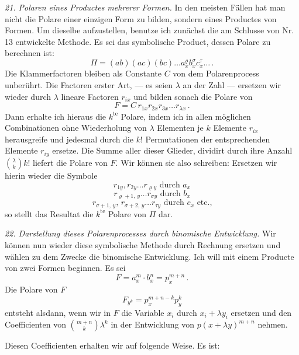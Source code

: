\textit{21. Polaren eines Productes mehrerer Formen.} In den meisten Fällen hat man nicht die Polare einer einzigen Form zu bilden, sondern eines Productes von Formen. Um dieselbe aufzustellen, benutze ich zunächst die am Schlusse von Nr. 13 entwickelte Methode. Es sei das symbolische Product, dessen Polare zu berechnen ist:
\[
\Pi = (ab)(ac)(bc)\dots a_x^\varrho b_x^\sigma c_x^\tau \dots\,.
\]
Die Klammerfactoren bleiben als Constante $C$ von dem Polarenprocess unberührt. Die Factoren erster Art, — es seien $\lambda$ an der Zahl — ersetzen wir wieder durch $\lambda$ lineare Factoren $r_{ix}$ und bilden sonach die Polare von
\[
F = C\,r_{1x}r_{2x}r_{3x}\dots r_{\lambda x}\,.
\]
Dann erhalte ich hieraus die $k^{\text{te}}$ Polare, indem ich in allen möglichen Combinationen ohne Wiederholung von $\lambda$ Elementen je $k$ Elemente $r_{ix}$ herausgreife und jedesmal durch die $k!$ Permutationen der entsprechenden Elemente $r_{iy}$ ersetze. Die Summe aller dieser Glieder, dividirt durch ihre Anzahl $\binom{\lambda}{k}k!$ liefert die Polare von $F$. Wir können sie also schreiben:
Ersetzen wir hierin wieder die Symbole
\[
r_{1y}, r_{2y}\dots r_{\varrho y} \text{ durch } a_x
\]
\[
r_{\varrho+1,\,y}\dots r_{\sigma y} \text{ durch } b_x
\]
\[
r_{\sigma+1,\,y},\, r_{\sigma+2,\,y}\dots r_{\tau y} \text{ durch } c_x \text{ etc.,}
\]
so stellt das Resultat die $k^{\text{te}}$ Polare von $\Pi$ dar.

\textit{22. Darstellung dieses Polarenprocesses durch binomische Entwicklung.} Wir können nun wieder diese symbolische Methode durch Rechnung ersetzen und wählen zu dem Zwecke die binomische Entwicklung. Ich will mit einem Producte von zwei Formen beginnen. Es sei
\[
F = a_x^m\cdot b_x^n = p_x^{m+n}\,.
\]
Die Polare von $F$
\[
F_{y^k} = p_x^{m+n-k}p_y^k
\]
entsteht alsdann, wenn wir in $F$ die Variable $x_i$ durch $x_i+\lambda y_i$ ersetzen und den Coefficienten von $\binom{m+n}{k}\lambda^k$ in der Entwicklung von $p(x+\lambda y)^{m+n}$ nehmen.

Diesen Coefficienten erhalten wir auf folgende Weise. Es ist:


